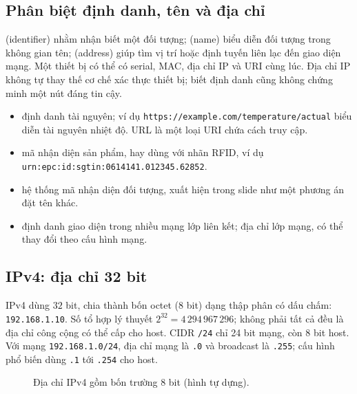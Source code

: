 \subsection{Phân biệt định danh, tên và địa chỉ}
 (identifier) nhằm nhận biết một đối tượng;  (name) biểu diễn đối tượng trong không gian tên;  (address) giúp tìm vị trí hoặc định tuyến liên lạc đến giao diện mạng. Một thiết bị có thể có serial, MAC, địa chỉ IP và URI cùng lúc. Địa chỉ IP không tự thay thế cơ chế xác thực thiết bị; biết định danh cũng không chứng minh một nút đáng tin cậy.
\begin{itemize}
\item {} định danh tài nguyên; ví dụ \texttt{https://example.com/temperature/actual} biểu diễn tài nguyên nhiệt độ. URL là một loại URI chứa cách truy cập.
\item {} mã nhận diện sản phẩm, hay dùng với nhãn RFID, ví dụ \texttt{urn:epc:id:sgtin:0614141.012345.62852}.
\item {} hệ thống mã nhận diện đối tượng, xuất hiện trong slide như một phương án đặt tên khác.
\item {} định danh giao diện trong nhiều mạng lớp liên kết;  địa chỉ lớp mạng, có thể thay đổi theo cấu hình mạng.
\end{itemize}
\subsection{IPv4: địa chỉ 32 bit}
IPv4 dùng \(32\) bit, chia thành bốn octet (8 bit) dạng thập phân có dấu chấm: \texttt{192.168.1.10}. Số tổ hợp lý thuyết \(2^{32}=4\,294\,967\,296\); không phải tất cả đều là địa chỉ công cộng có thể cấp cho host. CIDR \texttt{/24} chỉ 24 bit mạng, còn 8 bit host. Với mạng \texttt{192.168.1.0/24}, địa chỉ mạng là \texttt{.0} và broadcast là \texttt{.255}; cấu hình phổ biến dùng \texttt{.1} tới \texttt{.254} cho host.
\begin{figure}[htbp]\centering
{}\caption{Địa chỉ IPv4 gồm bốn trường 8 bit (hình tự dựng).}
\end{figure}

